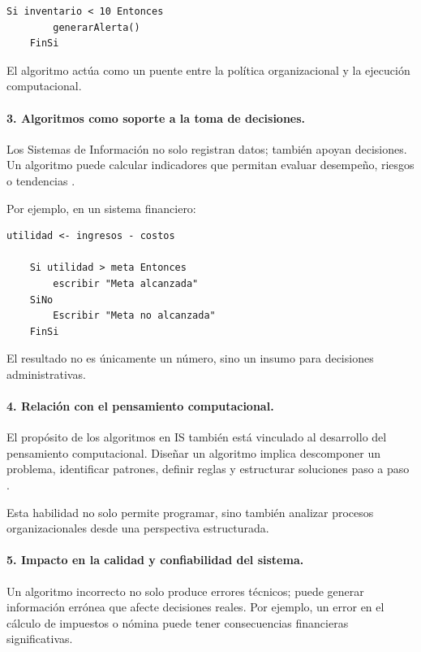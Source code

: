 \documentclass[12pt,twoside]{book}
\begin{document}
					\begin{lstlisting}[style=upsamStyle, caption={Regla de negocio implementada como algoritmo.},
						label={lst:ReglaNegocioInventario}, basicstyle=\small\ttfamily]
	Si inventario < 10 Entonces
		generarAlerta()
	FinSi \end{lstlisting}
					
					\noindent
					El algoritmo actúa como un puente entre la política organizacional y la ejecución computacional.
					
					\paragraph{3. Algoritmos como soporte a la toma de decisiones.} Los Sistemas de Información no solo registran datos; también apoyan decisiones. Un algoritmo puede calcular indicadores que permitan evaluar desempeño, riesgos o tendencias \cite{Laudon2020Management}. 
					
					Por ejemplo, en un sistema financiero:
					
					\begin{lstlisting}[style=upsamStyle, caption={Cálculo de utilidad como apoyo a decisiones.},
						label={lst:UtilidadDecision}, basicstyle=\small\ttfamily]
	utilidad <- ingresos - costos
	
	Si utilidad > meta Entonces
		escribir "Meta alcanzada"
	SiNo
		Escribir "Meta no alcanzada"
	FinSi \end{lstlisting}
	
					\noindent			
					El resultado no es únicamente un número, sino un insumo para decisiones administrativas.
					
					\paragraph{4. Relación con el pensamiento computacional.} El propósito de los algoritmos en IS también está vinculado al desarrollo del pensamiento computacional. Diseñar un algoritmo implica descomponer un problema, identificar patrones, definir reglas y estructurar soluciones paso a paso \cite{Wing2006Computational}. 
					
					Esta habilidad no solo permite programar, sino también analizar procesos organizacionales desde una perspectiva estructurada.
					
					\paragraph{5. Impacto en la calidad y confiabilidad del sistema.} Un algoritmo incorrecto no solo produce errores técnicos; puede generar información errónea que afecte decisiones reales. Por ejemplo, un error en el cálculo de impuestos o nómina puede tener consecuencias financieras significativas.
					
\end{document}
